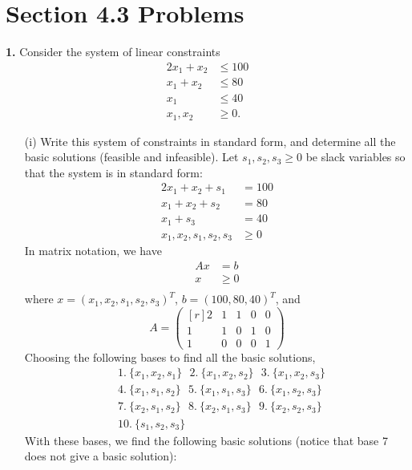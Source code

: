 \documentclass{article}
\begin{document}
\section*{Section 4.3 Problems}
\textbf{1.} Consider the system of linear constraints
\begin{align*}
    2x_1 + x_2 &\leq 100\\
    x_1 + x_2 &\leq 80\\
    x_1 & \leq 40\\
    x_1,x_2 &\geq 0.
\end{align*}
\begin{itemize}
    \item[(i)] Write this system of constraints in standard form, and determine all the basic solutions (feasible and infeasible).
    \newline\newline
    Let $s_1,s_2,s_3 \geq 0$ be slack variables so that the system is in standard form:
    \begin{align*}
        2x_1 + x_2 + s_1 &= 100\\
        x_1 + x_2 + s_2 &= 80\\
        x_1 + s_3 &= 40 \\
        x_1,x_2,s_1,s_2,s_3 &\geq 0
    \end{align*}
    In matrix notation, we have
    \begin{align*}
        Ax &= b\\
        x &\geq 0\\
    \end{align*}
    where $x = (x_1,x_2,s_1,s_2,s_3)^T$, $b = (100,80,40)^T$, and
    \[A = \begin{pmatrix*}[r]
        2 & 1 & 1 & 0 & 0\\
        1 & 1 & 0 & 1 & 0 \\
        1 & 0 & 0 & 0 & 1
    \end{pmatrix*}\]
    Choosing the following bases to find all the basic solutions,
    \begin{align*}
        &1. \:\{x_1,x_2,s_1\} \:\:\: 2. \:\{x_1, x_2, s_2\} \:\:\: 3. \:\{x_1,x_2,s_3\}\\
        &4. \:\{x_1,s_1,s_2\} \:\:\: 5. \:\{x_1, s_1, s_3\} \:\:\: 6. \:\{x_1,s_2,s_3\}\\
        &7. \:\{x_2, s_1, s_2\} \:\:\: 8. \:\{x_2,s_1,s_3\} \:\:\: 9. \:\{x_2, s_2, s_3\}\\
        &10. \:\{s_1,s_2,s_3\}
    \end{align*}
    With these bases, we find the following basic solutions (notice that base 7 does not give a basic solution):

\end{itemize}
\end{document}

